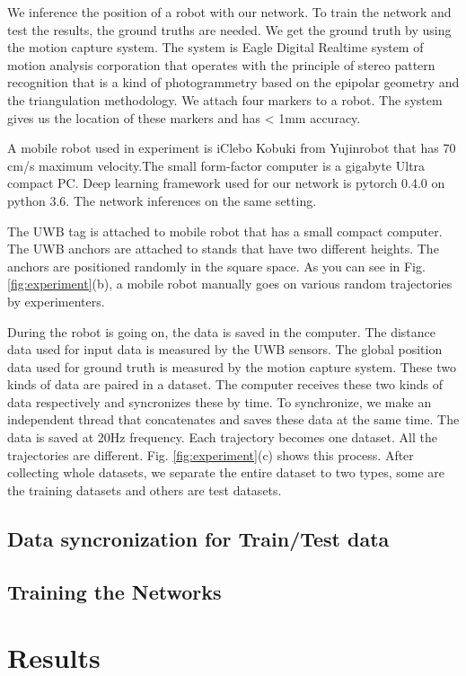 \documentclass{ieeeaccess}
\begin{document}
We inference the position of a robot with our network. To train the network and test the results, the ground truths are needed. We get the ground truth by using the motion capture system. The system is Eagle Digital Realtime system of motion analysis corporation that operates with the principle of stereo pattern recognition that is a kind of photogrammetry based on the epipolar geometry and the triangulation methodology. We attach four markers to a robot. The system gives us the location of these markers and has < 1mm accuracy.

A mobile robot used in experiment is iClebo Kobuki from Yujinrobot that has 70 cm/s maximum velocity.The small form-factor computer is a gigabyte Ultra compact PC. Deep learning framework used for our network is pytorch 0.4.0 on python 3.6. The network inferences on the same setting.

The UWB tag is attached to mobile robot that has a small compact computer. The UWB anchors are attached to stands that have two different heights. The anchors are positioned randomly in the square space. As you can see in Fig. \ref{fig:experiment}(b), a mobile robot manually goes on various random trajectories by experimenters.

During the robot is going on, the data is saved in the computer. The distance data used for input data is measured by the UWB sensors. The global position data used for ground truth is measured by the motion capture system. These two kinds of data are paired in a dataset. The computer receives these two kinds of data respectively and syncronizes these by time. To synchronize, we make an independent thread that concatenates and saves these data at the same time. The data is saved at 20Hz frequency. Each trajectory becomes one dataset. All the trajectories are different. Fig. \ref{fig:experiment}(c) shows this process. After collecting whole datasets, we separate the entire dataset to two types, some are the training datasets and others are test datasets.

\subsection{Data syncronization for Train/Test data}
\subsection{Training the Networks}


\section{Results}
\end{document}
